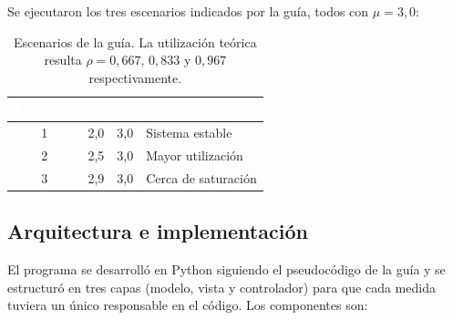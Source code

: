 \documentclass[11pt,a4paper]{article}
\renewcommand{\arraystretch}{1.08}
\begin{document}
Se ejecutaron los tres escenarios indicados por la guía, todos con $\mu = 3{,}0$:

\begin{table}[h!]
\centering
\setlength{\arrayrulewidth}{0.75pt}
\renewcommand{\arraystretch}{1.25}
\begin{tabular}{|c|c|c|l|}
\hline
\rowcolor{headerblue}
\textbf{\textcolor{white}{Escenario}} & \textbf{\textcolor{white}{$\lambda$}} & \textbf{\textcolor{white}{$\mu$}} & \textbf{\textcolor{white}{Condición}} \\ \hline
1 & 2{,}0 & 3{,}0 & Sistema estable \\ \hline
\rowcolor{rowlight}
2 & 2{,}5 & 3{,}0 & Mayor utilización \\ \hline
3 & 2{,}9 & 3{,}0 & Cerca de saturación \\ \hline
\end{tabular}
\caption{Escenarios de la guía. La utilización teórica resulta $\rho = 0{,}667$,
$0{,}833$ y $0{,}967$ respectivamente.}
\end{table}

\subsection{Arquitectura e implementación}

El programa se desarrolló en Python siguiendo el pseudocódigo de la guía y se
estructuró en tres capas (modelo, vista y controlador) para que cada medida tuviera un
único responsable en el código. Los componentes son:
\end{document}
